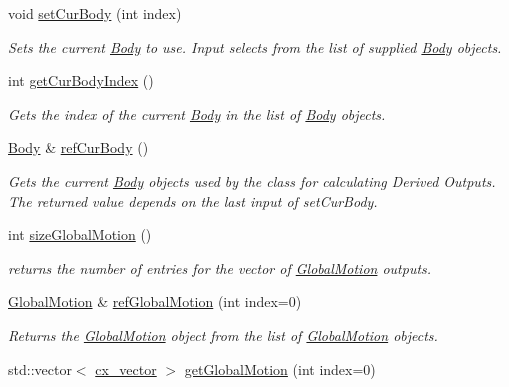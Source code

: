 \begin{DoxyCompactItemize}
void \hyperlink{classosea_1_1ofreq_1_1_outputs_body_a4b33361c2888937d2aa450f3e6df200d}{set\-Cur\-Body} (int index)
\begin{DoxyCompactList}\small\item\em Sets the current \hyperlink{classosea_1_1ofreq_1_1_body}{Body} to use. Input selects from the list of supplied \hyperlink{classosea_1_1ofreq_1_1_body}{Body} objects. \end{DoxyCompactList}\item 
int \hyperlink{classosea_1_1ofreq_1_1_outputs_body_a7331d48ef7cee6bd23ac0ab487894d6c}{get\-Cur\-Body\-Index} ()
\begin{DoxyCompactList}\small\item\em Gets the index of the current \hyperlink{classosea_1_1ofreq_1_1_body}{Body} in the list of \hyperlink{classosea_1_1ofreq_1_1_body}{Body} objects. \end{DoxyCompactList}\item 
\hyperlink{classosea_1_1ofreq_1_1_body}{Body} \& \hyperlink{classosea_1_1ofreq_1_1_outputs_body_afdb3f49b84baf1a6b2de8a5d014abfe5}{ref\-Cur\-Body} ()
\begin{DoxyCompactList}\small\item\em Gets the current \hyperlink{classosea_1_1ofreq_1_1_body}{Body} objects used by the class for calculating Derived Outputs. The returned value depends on the last input of set\-Cur\-Body. \end{DoxyCompactList}\item 
int \hyperlink{classosea_1_1ofreq_1_1_outputs_body_acf20f3cfb2baee6c93a2e17d7e27aa0c}{size\-Global\-Motion} ()
\begin{DoxyCompactList}\small\item\em returns the number of entries for the vector of \hyperlink{classosea_1_1ofreq_1_1_global_motion}{Global\-Motion} outputs. \end{DoxyCompactList}\item 
\hyperlink{classosea_1_1ofreq_1_1_global_motion}{Global\-Motion} \& \hyperlink{classosea_1_1ofreq_1_1_outputs_body_a54325e076109111454b5ed0633c85660}{ref\-Global\-Motion} (int index=0)
\begin{DoxyCompactList}\small\item\em Returns the \hyperlink{classosea_1_1ofreq_1_1_global_motion}{Global\-Motion} object from the list of \hyperlink{classosea_1_1ofreq_1_1_global_motion}{Global\-Motion} objects. \end{DoxyCompactList}\item 
std\-::vector$<$ \hyperlink{namespaceosea_1_1ofreq_a42bf1d8bbba99693142c4184486ad3e0}{cx\-\_\-vector} $>$ \hyperlink{classosea_1_1ofreq_1_1_outputs_body_a7450d306af9db6bb159a1186f017ce6e}{get\-Global\-Motion} (int index=0)

\end{DoxyCompactItemize}

